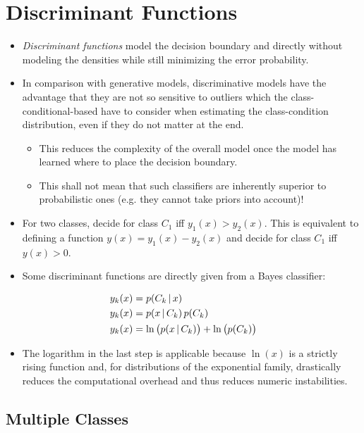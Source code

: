 	\section{Discriminant Functions}
		\begin{itemize}
			\item \emph{Discriminant functions} model the decision boundary and directly without modeling the densities while still minimizing the error probability.
			\item In comparison with generative models, discriminative models have the advantage that they are not so sensitive to outliers which the class-conditional-based have to consider when estimating the class-condition distribution, even if they do not matter at the end.
				\begin{itemize}
					\item This reduces the complexity of the overall model once the model has learned where to place the decision boundary.
					\item This shall not mean that such classifiers are inherently superior to probabilistic ones (e.g. they cannot take priors into account)!
				\end{itemize}
			\item For two classes, decide for class \(C_1\) iff \( y_1(x) > y_2(x) \). This is equivalent to defining a function \( y(x) = y_1(x) - y_2(x) \) and decide for class \(C_1\) iff \( y(x) > 0 \).
			\item Some discriminant functions are directly given from a Bayes classifier:
		\end{itemize}
		\begin{align}
			y_k(x) &= p(C_k \,\vert\, x) \\
			y_k(x) &= p(x \,\vert\, C_k) \, p(C_k) \\
			y_k(x) &= \ln\big(p(x \,\vert\, C_k)\big) + \ln\big(p(C_k)\big)
		\end{align}
		\begin{itemize}
			\item[] The logarithm in the last step is applicable because \(\ln(x)\) is a strictly rising function and, for distributions of the exponential family, drastically reduces the computational overhead and thus reduces numeric instabilities.
		\end{itemize}

		\subsection{Multiple Classes}
			\label{sec:classificationMultiple}

